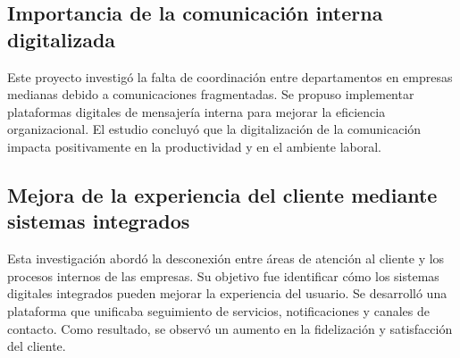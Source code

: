 \subsection{Importancia de la comunicación interna digitalizada \cite{Reyes2012}}

Este proyecto investigó la falta de coordinación entre departamentos en empresas medianas debido a comunicaciones fragmentadas. Se propuso implementar plataformas digitales de mensajería interna para mejorar la eficiencia organizacional. El estudio concluyó que la digitalización de la comunicación impacta positivamente en la productividad y en el ambiente laboral.

\subsection{Mejora de la experiencia del cliente mediante sistemas integrados \cite{Patino2019}}

Esta investigación abordó la desconexión entre áreas de atención al cliente y los procesos internos de las empresas. Su objetivo fue identificar cómo los sistemas digitales integrados pueden mejorar la experiencia del usuario. Se desarrolló una plataforma que unificaba seguimiento de servicios, notificaciones y canales de contacto. Como resultado, se observó un aumento en la fidelización y satisfacción del cliente.

